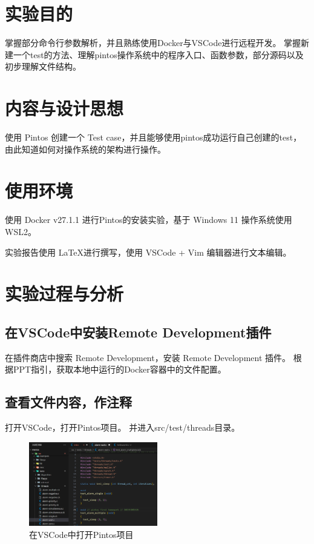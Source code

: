 \tableofcontents %

\section{实验目的}

掌握部分命令行参数解析，并且熟练使用Docker与VSCode进行远程开发。
掌握新建一个test的方法、理解pintos操作系统中的程序入口、函数参数，部分源码以及初步理解文件结构。

\section{内容与设计思想}

使用 Pintos 创建一个 Test case，并且能够使用pintos成功运行自己创建的test，由此知道如何对操作系统的架构进行操作。

\section{使用环境}

使用 Docker v27.1.1 进行Pintos的安装实验，基于 Windows 11 操作系统使用 WSL2。

实验报告使用 \LaTeX 进行撰写，使用 VSCode + Vim 编辑器进行文本编辑。

\section{实验过程与分析}

\subsection{在VSCode中安装Remote Development插件}

在插件商店中搜索 Remote Development，安装 Remote Development 插件。
根据PPT指引，获取本地中运行的Docker容器中的文件配置。

\subsection{查看文件内容，作注释}

打开VSCode，打开Pintos项目。
并进入src/test/threads目录。
\begin{figure}[H]
  \centering
  \includegraphics[width=0.5\textwidth]{img2/1.png}
  \caption{在VSCode中打开Pintos项目}
\end{figure}

